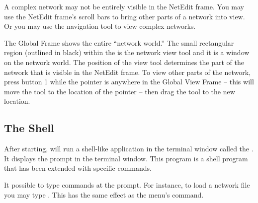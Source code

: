 A complex network may not be entirely visible in the NetEdit frame.  You may
use the NetEdit frame's scroll bars to bring other parts of a network into
view.  Or you may use the navigation tool to view complex networks.

The Global Frame shows the entire ``network world.''  The small
rectangular region (outlined in black) within the  is the
network view tool and it is a window on the network world.  The
position of the view tool determines the part of the network that is
visible in the NetEdit frame.  To view other parts of the network, press
button 1 while the pointer is anywhere in the Global View Frame -- this will
move the tool to the location of the pointer --  then drag the tool to the
new location.


\subsection{The \sr{} Shell}
\label{sec:termapp}

After starting, \sr{} will run a shell-like application in the terminal
window called the .  It displays the prompt
 in the terminal window.  This program is a
 shell program that has been extended with
\sr{} specific commands.

It possible to type \tcl{} \sr{} commands at the prompt.  For
instance, to load a network file you may type .  This has the same effect as the 
menu's  command.



